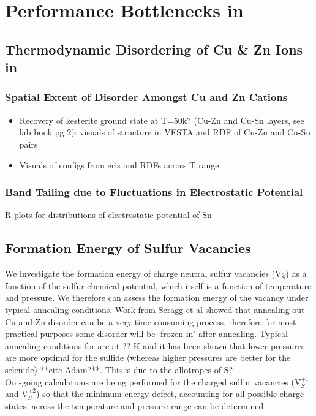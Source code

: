 \chapter{Performance Bottlenecks in \CZTS}

\section{Thermodynamic Disordering of Cu \& Zn Ions in \CZTS}
\subsection{Spatial Extent of Disorder Amongst Cu and Zn Cations}
\begin{itemize}
\item Recovery of kesterite ground state at T=50k? (Cu-Zn and Cu-Sn layers, see lab book pg 2): visuals of structure in VESTA and RDF of Cu-Zn and Cu-Sn pairs
\item Visuals of configs from eris and RDFs across T range 
\end{itemize}
\subsection{Band Tailing due to Fluctuations in Electrostatic Potential}
R plots for distributions of electrostatic potential of Sn

\section{Formation Energy of Sulfur Vacancies}
We investigate the formation energy of charge neutral sulfur vacancies (V$_{S}^{0}$) as a function of the sulfur chemical potential, which itself is a function of temperature and pressure. We therefore can assess the formation energy of the vacancy under typical annealing conditions. Work from Scragg et al showed that annealing out Cu and Zn disorder can be a very time consuming process, therefore for most practical purposes some disorder will be `frozen in' after annealing. Typical annealing conditions for { \CZTS } are at ?? K and it has been shown that lower pressures are more optimal for the sulfide (whereas higher pressures are better for the selenide) **cite Adam?**. This is due to the allotropes of S?\\

On -going calculations are being performed for the charged sulfur vacancies (V$_{S}^{+1}$ and V$_{S}^{+2}$) so that the minimum energy defect, accounting for all possible charge states, across the temperature and pressure range can be determined.

